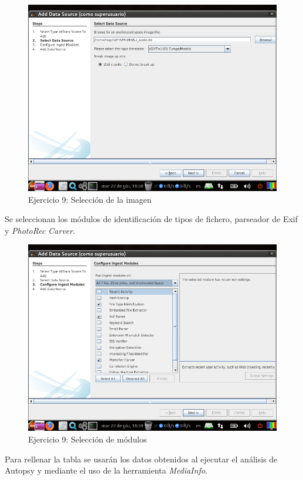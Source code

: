 \documentclass[11pt]{article}
\begin{document}
\begin{figure}[H]
    \caption{Ejercicio 9: Selección de la imagen}
    \centering
    \includegraphics[scale=0.7]{e9-3.png}
\end{figure}

Se seleccionan los módulos de identificación de tipos de fichero, parseador de Exif y \textit{PhotoRec Carver}.

\begin{figure}[H]
    \caption{Ejercicio 9: Selección de módulos}
    \centering
    \includegraphics[scale=0.7]{e9-4.png}
\end{figure}

Para rellenar la tabla se usarán los datos obtenidos al ejecutar el análisis de Autopsy y mediante el uso de la herramienta \textit{MediaInfo}.
\end{document}
